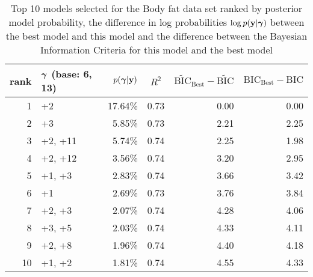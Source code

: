 \begin{table}[h]
	\begin{center}
		\begin{tabular}{r|l|r|c|r|r}
			rank & ${\boldsymbol \gamma}$ (base: 6, 13) & $p({\boldsymbol \gamma}|{\bf y})$ & $R^2$ & $\widetilde{\text{BIC}}_\text{Best} - \widetilde{\text{BIC}}$ & $\text{BIC}_\text{Best} - \text{BIC}$ \\
			\hline
			1  &  +2&  17.64\%&  0.73&  0.00&  0.00\\
			2 &  +3&  5.85\%&  0.73&  2.21&  2.25\\
			3 &  +2, +11&  5.74\%&  0.74&  2.25&  1.98\\
			4 &  +2, +12&  3.56\%&  0.74&  3.20&  2.95\\
			5 &  +1, +3&  2.83\%&  0.74&  3.66&  3.42\\
			6 &  +1&  2.69\%&  0.73&  3.76&  3.84\\
			7 &  +2, +3&  2.07\%&  0.74&  4.28&  4.06\\
			8 &  +3, +5&  2.03\%&  0.74&  4.33&  4.11\\
			9 &  +2, +8&  1.96\%&  0.74&  4.40&  4.18\\
			10 &  +1, +2&  1.81\%&  0.74&  4.55&  4.33\\
		\end{tabular}
	\end{center}
	\label{tab:numerical_results_bodyfat}
	\caption{Top 10 models selected for the Body fat data set ranked by posterior model probability, the difference
		in log probabilities $\log p({\bf y}|{\boldsymbol \gamma})$ between the best model and this model and the difference
		between the Bayesian Information Criteria for this model and the best model}
\end{table}

